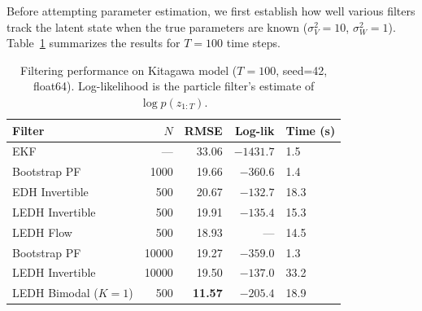 \documentclass{article}
\begin{document}
Before attempting parameter estimation, we first establish how well various filters track the latent state when the true parameters are known ($\sigma_V^2 = 10$, $\sigma_W^2 = 1$). Table~\ref{tab:kitagawa_filters} summarizes the results for $T = 100$ time steps.

\begin{table}[H]
\centering
\begin{tabular}{lrrrl}
\toprule
Filter & $N$ & RMSE & Log-lik & Time (s) \\
\midrule
EKF & --- & 33.06 & $-1431.7$ & 1.5 \\
Bootstrap PF & 1000 & 19.66 & $-360.6$ & 1.4 \\
EDH Invertible & 500 & 20.67 & $-132.7$ & 18.3 \\
LEDH Invertible & 500 & 19.91 & $-135.4$ & 15.3 \\
LEDH Flow & 500 & 18.93 & --- & 14.5 \\
Bootstrap PF & 10000 & 19.27 & $-359.0$ & 1.3 \\
LEDH Invertible & 10000 & 19.50 & $-137.0$ & 33.2 \\
\midrule
LEDH Bimodal ($K\!=\!1$) & 500 & \textbf{11.57} & $-205.4$ & 18.9 \\
\bottomrule
\end{tabular}
\caption{Filtering performance on Kitagawa model ($T=100$, seed=42, float64). Log-likelihood is the particle filter's estimate of $\log p(z_{1:T})$.}
\label{tab:kitagawa_filters}
\end{table}
\end{document}
